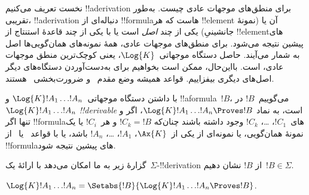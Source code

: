 \documentclass[../../../include/open-logic-section]{subfiles}
\begin{document}


نخست تعریف می‌کنیم !!a{derivation} برای منطق‌های موجهات عادی چیست.
به‌طور تقریبی، !!a{derivation} دنباله‌ای از !!{formula}هاست که هر
!!{element} آن یا (نمونهٔ جانشینیِ) یکی از چند \emph{اصل} است یا با یکی
از چند قاعدهٔ استنتاج از !!{element}های پیشین نتیجه می‌شود. برای
منطق‌های موجهات عادی، همهٔ نمونه‌های همان‌گویی‌ها
 اصل به شمار می‌آیند.
حاصل دستگاه موجهاتی~$\Log{K}$، یعنی کوچک‌ترین منطق موجهات عادی، است.
بااین‌حال، ممکن است بخواهیم برای به‌دست‌آوردن دستگاه‌های دیگر اصل‌های
دیگری بیفزاییم. قواعد همیشه وضع مقدم~\MP{} و ضرورت‌بخشی~\Nec{} هستند.

\begin{defn}
  با داشتن دستگاه موجهاتی~$\Log{K} !A_1 \dots !A_n$ و
  !!a{formula}~$!B$، می‌گوییم~$!B$ در~$\Log{K} !A_1 \dots !A_n$
  \emph{!!{derivable}} است، به نماد
  $\Log{K} !A_1 \dots !A_n \Proves !B$، اگر و تنها اگر
  !!{formula}های~$!C_1$، \dots، $!C_k$ وجود داشته باشند چنان‌که
  $!C_k = !B$ و هر~$!C_i$ یا یک نمونهٔ همان‌گویی، یا نمونه‌ای از یکی
  از~$\Ax{K}$، $!A_1$، \dots، $!A_n$
  باشد، یا با قواعد~\MP{} یا~\Nec{} از !!{formula}های پیشین نتیجه شود.
\end{defn}

گزارهٔ زیر به ما امکان می‌دهد با ارائهٔ یک~$\Sigma$-!!{derivation} از
$!B$ نشان دهیم~$!B \in \Sigma$.

\begin{prop}
  $\Log{K} !A_1 \dots !A_n = \Setabs{!B}{\Log{K} !A_1 \dots !A_n \Proves !B}$.
\end{prop}
\end{document}
